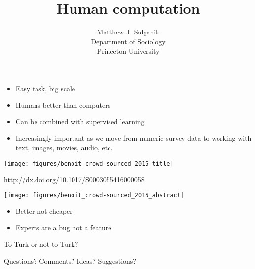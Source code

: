 \documentclass[aspectratio=169]{beamer}
\title[]{Human computation}
\author[]{Matthew J. Salganik\\Department of Sociology\\Princeton University}
\date[]{Summer Institute in Computational Social Science\\June 23, 2017
\vfill
\begin{flushright}
\vspace{0.6in}
\texttt{[image: figures/cc-by.png]}
\end{flushright}
}
\def\vf{\vfill}
\begin{document}
\frame{\titlepage}
\begin{frame}

\begin{itemize}
\item Easy task, big scale
\pause
\item Humans better than computers
\pause
\item Can be combined with supervised learning
\pause
\item Increasingly important as we move from numeric survey data to working with text, images, movies, audio, etc.
\end{itemize}

\end{frame}
\begin{frame}

\begin{center}
\texttt{[image: figures/benoit\_crowd-sourced\_2016\_title]}
\end{center}

\vf
{\tiny \url{http://dx.doi.org/10.1017/S0003055416000058}}

\end{frame}
\begin{frame}

\begin{center}
\texttt{[image: figures/benoit\_crowd-sourced\_2016\_abstract]}
\end{center}

\end{frame}
\begin{frame}

\begin{itemize}
\item Better not cheaper
\pause
\item Experts are a bug not a feature
\end{itemize}

\end{frame}
\begin{frame}

{\Large
\begin{center}
To Turk or not to Turk?
\end{center}
}

\end{frame}
\begin{frame}

{\Large
\begin{center}
Questions?  Comments?  Ideas? Suggestions?
\end{center}
}

\end{frame}
\end{document}
